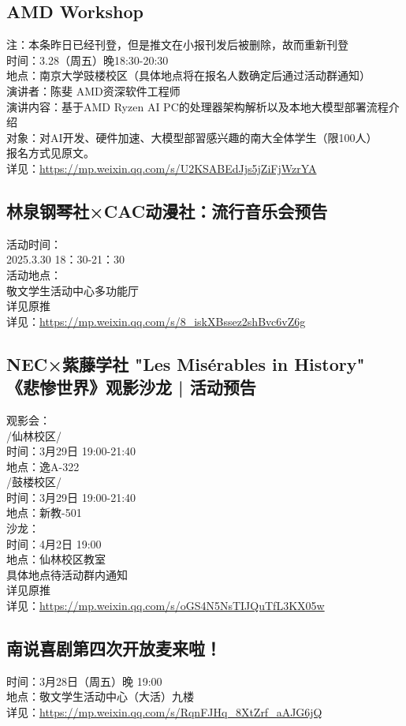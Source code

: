 \documentclass[letterpaper, 12pt]{article}
\begin{document}
\begin{multicols}{2}
\subsection{AMD Workshop}
注：本条昨日已经刊登，但是推文在小报刊发后被删除，故而重新刊登\\
时间：3.28（周五）晚18:30-20:30
\\地点：南京大学豉楼校区（具体地点将在报名人数确定后通过活动群通知）
\\演讲者：陈斐 AMD资深软件工程师
\\演讲内容：基于AMD Ryzen AI PC的处理器架构解析以及本地大模型部署流程介绍
\\对象：对AI开发、硬件加速、大模型部習感兴趣的南大全体学生（限100人）
\\报名方式见原文。
\\详见：\url{https://mp.weixin.qq.com/s/U2KSABEdJjs5jZiFjWzrYA}

\subsection{林泉钢琴社×CAC动漫社：流行音乐会预告}
活动时间：
\\2025.3.30 18：30-21：30
\\活动地点：
\\敬文学生活动中心多功能厅
\\详见原推
\\详见：\url{https://mp.weixin.qq.com/s/8_iskXBssez2shBvc6vZ6g}


\subsection{NEC×紫藤学社 "Les Misérables in History" 《悲惨世界》观影沙龙 | 活动预告}
观影会：
\\/仙林校区/
\\时间：3月29日 19:00-21:40
\\地点：逸A-322
\\/鼓楼校区/
\\时间：3月29日 19:00-21:40
\\地点：新教-501
\\沙龙：
\\时间：4月2日 19:00
\\地点：仙林校区教室 
\\具体地点待活动群内通知
\\详见原推
\\详见：\url{https://mp.weixin.qq.com/s/oGS4N5NsTIJQuTfL3KX05w}

\subsection{ 南说喜剧第四次开放麦来啦！}
时间：3月28日（周五）晚 19:00
\\地点：敬文学生活动中心（大活）九楼
\\详见：\url{https://mp.weixin.qq.com/s/RqnFJHq_8XtZrf_aAJG6jQ}
\end{multicols}
\end{document}
